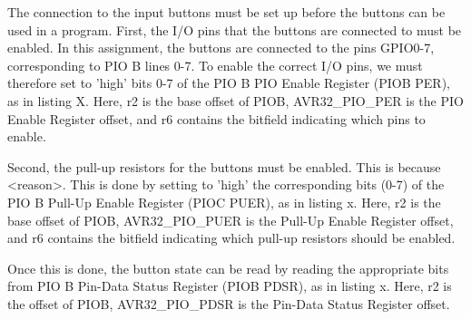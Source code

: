 The connection to the input buttons must be set up before the buttons can be used in a program.
First, the I/O pins that the buttons are connected to must be enabled.
In this assignment, the buttons are connected to the pins GPIO0-7, corresponding to PIO B lines 0-7.
To enable the correct I/O pins, we must therefore set to 'high' bits 0-7 of the PIO B PIO Enable Register (PIOB PER), as in listing X.
Here, r2 is the base offset of PIOB, AVR32\_PIO\_PER is the PIO Enable Register offset, and r6 contains the bitfield indicating which pins to enable.


Second, the pull-up resistors for the buttons must be enabled. This is because <reason>.
This is done by setting to 'high' the corresponding bits (0-7) of the PIO B Pull-Up Enable Register (PIOC PUER), as in listing x.
Here, r2 is the base offset of PIOB, AVR32\_PIO\_PUER is the Pull-Up Enable Register offset, and r6 contains the bitfield indicating which pull-up resistors should be enabled.


Once this is done, the button state can be read by reading the appropriate bits from PIO B Pin-Data Status Register (PIOB PDSR), as in listing x.
Here, r2 is the offset of PIOB, AVR32\_PIO\_PDSR is the Pin-Data Status Register offset.

